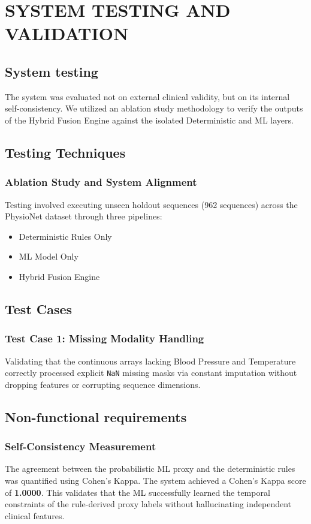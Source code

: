 \documentclass[12pt,a4paper]{report}
\begin{document}
\chapter{SYSTEM TESTING AND VALIDATION}

\section{System testing}
The system was evaluated not on external clinical validity, but on its internal self-consistency. We utilized an ablation study methodology to verify the outputs of the Hybrid Fusion Engine against the isolated Deterministic and ML layers.

\section{Testing Techniques}
\subsection{Ablation Study and System Alignment}
Testing involved executing unseen holdout sequences (962 sequences) across the PhysioNet dataset through three pipelines:
\begin{itemize}
    \item Deterministic Rules Only
    \item ML Model Only
    \item Hybrid Fusion Engine
\end{itemize}

\section{Test Cases}
\subsection{Test Case 1: Missing Modality Handling}
Validating that the continuous arrays lacking Blood Pressure and Temperature correctly processed explicit \texttt{NaN} missing masks via constant imputation without dropping features or corrupting sequence dimensions.

\section{Non-functional requirements}
\subsection{Self-Consistency Measurement}
The agreement between the probabilistic ML proxy and the deterministic rules was quantified using Cohen's Kappa. The system achieved a Cohen's Kappa score of \textbf{1.0000}. This validates that the ML successfully learned the temporal constraints of the rule-derived proxy labels without hallucinating independent clinical features.
\end{document}
